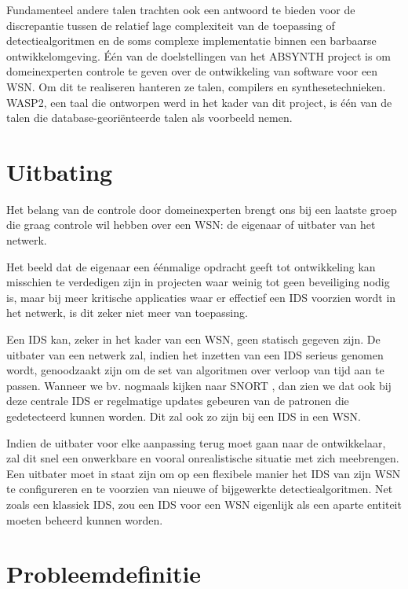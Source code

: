 Fundamenteel andere talen trachten ook een antwoord te bieden voor de
discrepantie tussen de relatief lage complexiteit van de toepassing of
detectiealgoritmen en de soms complexe implementatie binnen een barbaarse
ontwikkelomgeving. \'E\'en van de doelstellingen van het ABSYNTH project
\citep{url:absynth} is om domeinexperten controle te geven over de ontwikkeling
van software voor een WSN. Om dit te realiseren hanteren ze talen, compilers en
synthesetechnieken. WASP2, een taal die ontworpen werd in het kader van dit
project, is \'e\'en van de talen die database-geori\"enteerde talen als
voorbeeld nemen.

\section{Uitbating}
\label{section:problem-operations}

Het belang van de controle door domeinexperten brengt ons bij een laatste groep
die graag controle wil hebben over een WSN: de eigenaar of uitbater van het
netwerk.

Het beeld dat de eigenaar een \'e\'enmalige opdracht geeft tot ontwikkeling kan
misschien te verdedigen zijn in projecten waar weinig tot geen beveiliging
nodig is, maar bij meer kritische applicaties waar er effectief een IDS
voorzien wordt in het netwerk, is dit zeker niet meer van toepassing.

Een IDS kan, zeker in het kader van een WSN, geen statisch gegeven zijn. De
uitbater van een netwerk zal, indien het inzetten van een IDS serieus genomen
wordt, genoodzaakt zijn om de set van algoritmen over verloop van tijd aan te
passen. Wanneer we bv. nogmaals kijken naar SNORT \citep{roesch1999snort}, dan
zien we dat ook bij deze centrale IDS er regelmatige updates gebeuren van de
patronen die gedetecteerd kunnen worden. Dit zal ook zo zijn bij een IDS in een
WSN.

Indien de uitbater voor elke aanpassing terug moet gaan naar de ontwikkelaar,
zal dit snel een onwerkbare en vooral onrealistische situatie met zich
meebrengen. Een uitbater moet in staat zijn om op een flexibele manier het IDS
van zijn WSN te configureren en te voorzien van nieuwe of bijgewerkte
detectiealgoritmen. Net zoals een klassiek IDS, zou een IDS voor een WSN
eigenlijk als een aparte entiteit moeten beheerd kunnen worden.

\section{Probleemdefinitie}
\label{section:problem-definition}

